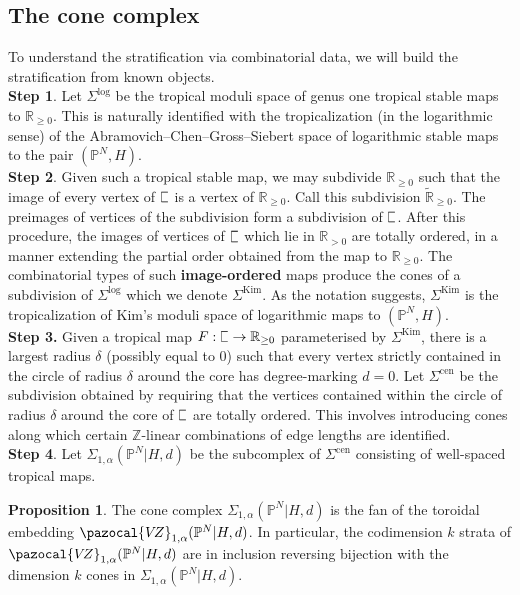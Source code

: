 \documentclass[11pt]{amsart}
\newcommand{\plC}{\scalebox{0.8}[1.3]{$\sqsubset$}}
\newcommand{\Kim}{\operatorname{Kim}}
\newcommand{\PP}{\mathbb P}
\newcommand{\Z}{\mathbb{Z}}
\newcommand{\VZ}{\pazocal{V\!Z}}
\renewcommand{\to}{\rightarrow}
\newcommand{\RR}{\mathbb{R}}
\theoremstyle{definition}
\newtheorem{prop}[thm]{Proposition}
\theoremstyle{definition}
\begin{document}
\subsection{The cone complex} To understand the stratification via combinatorial data, we will build the stratification from known objects. \\

\noindent
\textbf{Step 1}. Let $\Sigma^{\mathrm{log}}$ be the tropical moduli space of genus one tropical stable maps to $\mathbb R_{\geq 0}$. This is naturally identified with the tropicalization (in the logarithmic sense) of the Abramovich--Chen--Gross--Siebert space of logarithmic stable maps to the pair $(\mathbb P^N,H)$. \\

\noindent
\textbf{Step 2}. Given such a tropical stable map, we may subdivide $\mathbb R_{\geq 0}$ such that the image of every vertex of $\plC$ is a vertex of $\mathbb R_{\geq 0}$. Call this subdivision $\widetilde{\mathbb R}_{\geq 0}$. The preimages of vertices of the subdivision form a subdivision of $\plC$. After this procedure, the images of vertices of $\plC$ which lie in $\RR_{>0}$ are totally ordered, in a manner extending the partial order obtained from the map to $\mathbb R_{\geq 0}$. The combinatorial types of such \textbf{image-ordered} maps produce the cones of a subdivision of $\Sigma^{\mathrm{log}}$ which we denote $\Sigma^{\mathrm{Kim}}$. As the notation suggests, $\Sigma^{\Kim}$ is the tropicalization of Kim's moduli space of logarithmic maps to $(\PP^N,H)$.\\

\noindent
\textbf{Step 3.} Given a tropical map $F: \plC\to \mathbb R_{\geq 0}$ parameterised by $\Sigma^{\mathrm{Kim}}$, there is a largest radius $\delta$ (possibly equal to $0$) such that every vertex strictly contained in the circle of radius $\delta$ around the core has degree-marking $d=0$. Let $
\Sigma^{\mathrm{cen}}$ be the subdivision obtained by requiring that the vertices contained within the circle of radius $\delta$ around the core of $\plC$ are totally ordered. This involves introducing cones along which certain $\Z$-linear combinations of edge lengths are identified.\\

\noindent
\textbf{Step 4}. Let $\Sigma_{1,\alpha}(\mathbb P^N|H,d)$ be the subcomplex of $\Sigma^{\mathrm{cen}}$ consisting of well-spaced tropical maps.

\begin{prop}
The cone complex $
\Sigma_{1,\alpha}(\mathbb P^N|H,d)$ is the fan of the toroidal embedding $
\VZ_{1,\alpha}(\mathbb P^N|H,d)$. In particular, the codimension $k$ strata of $
\VZ_{1,\alpha}(\mathbb P^N|H,d)$ are in inclusion reversing bijection with the dimension $k$ cones in $
\Sigma_{1,\alpha}(\mathbb P^N|H,d)$.
\end{prop}
\end{document}
